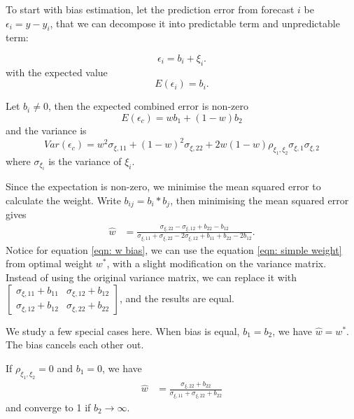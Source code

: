 \documentclass[11pt]{article}
\begin{document}
To start with bias estimation, let the prediction error from forecast \(i\) be \(\epsilon_i = y - y_i\), that we can decompose it into predictable term and unpredictable term:

\begin{equation}
\label{eqn: w bias assumption}
\epsilon_i = b_i + \xi_i. 
\end{equation}
with the expected value
\begin{equation}
\label{eqn: bias estimate}
E(\epsilon_i) = b_i.
\end{equation}

Let $b_i \neq 0$, then the expected combined error is non-zero
\begin{equation}
E(\epsilon_c) = wb_1+(1-w)b_2
\end{equation}
and the variance is
\begin{equation}
Var(\epsilon_c) = w^2\sigma_{\xi,11} + (1-w)^2\sigma_{\xi,22} + 2w(1-w)\rho_{\xi_1,\xi_2}\sigma_{\xi,1}\sigma_{\xi,2}
\end{equation}
where $\sigma_{\xi_i}$ is the variance of $\xi_i$.

Since the expectation is non-zero, we minimise the mean squared error to calculate the weight.
Write \(b_{ij}=b_i*b_j\), then minimising the mean squared error gives
\begin{equation}
\label{eqn: w bias}
\begin{aligned}
\hat{w} &= \frac{\sigma_{\xi,22}-\sigma_{\xi,12}+b_{22}-b_{12}}{\sigma_{\xi,11}+\sigma_{\xi,22}-2\sigma_{\xi,12}+b_{11}+b_{22}-2b_{12}}.
\end{aligned}
\end{equation}
Notice for equation \ref{eqn: w bias}, we can use the equation \ref{eqn: simple weight} from optimal weight $w^*$, with a slight modification on the variance matrix. Instead of using the original variance matrix, we can replace it with
\(\begin{bmatrix}\sigma_{\xi,11}+b_{11} & \sigma_{\xi,12}+b_{12}\\ \sigma_{\xi,12}+b_{12} & \sigma_{\xi,22}+b_{22}\end{bmatrix}\), and the results are equal.

We study a few special cases here. When bias is equal, $b_1=b_2$, we have $\hat{w}=w^*$. The bias cancels each other out. 

If $\rho_{\xi_1,\xi_2}=0$ and $b_1=0$, we have
\begin{equation}
\begin{aligned}
\hat{w} &= \frac{\sigma_{\xi,22}+b_{22}}{\sigma_{\xi,11}+\sigma_{\xi,22}+b_{22}}
\end{aligned}
\end{equation}
and converge to 1 if $b_2 \to \infty$.
\end{document}
